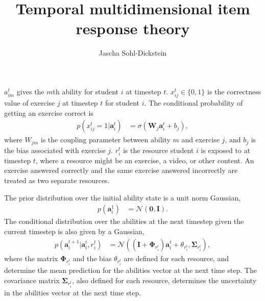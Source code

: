 \documentclass{article}
\title{
Temporal multidimensional item response theory
}
\author{
Jascha Sohl-Dickstein
}
\newcommand{\mb}{\mathbf}
\newcommand{\mc}{\mathcal}
\begin{document}
\maketitle

$a_{im}^t$ gives the $m$th ability for student $i$ at timestep $t$.  $x_{ij}^t \in \{0,1\}$ is the correctness value of exercise $j$ at timestep $t$ for student $i$.  The conditional probability of getting an exercise correct is
\begin{align}
p\left( x_{ij}^t = 1 | \mb a_i^t \right) & = \sigma\left( \mb W_j \mb a_i^t + b_j \right),
\label{eq cond x}
\end{align}
where $W_{jm}$ is the coupling parameter between ability $m$ and exercise $j$, and $b_j$ is the bias associated with exercise $j$.  
$r_i^t$ is the resource student $i$ is exposed to at timestep $t$, where a resource might be an exercise, a video, or other content.  An exercise answered correctly and the same exercise answered incorrectly are treated as two separate resources.

The prior distribution over the initial ability state is a unit norm Gaussian,
\begin{align}
p\left( \mb a_i^1 \right) & = \mc N \left( \mb 0, \mb I\right).
\end{align}
The conditional distribution over the abilities at the next timestep given the current timestep is also given by a Gaussian,
\begin{align}
p\left(  \mb a_i^{t+1} | \mb a_i^t, r_i^t \right) & = \mc N \left( \left(\mb I + \mb \Phi_{r_i^t}\right) \mb a_i^t + \theta_{r_i^t}, \mb \Sigma_{r_i^t} \right)
,
\label{eq cond a}
\end{align}
where the matrix $\mb \Phi_{r_i^t}$ and the bias $\theta_{r_i^t}$ are defined for each resource, and determine the mean prediction for the abilities vector at the next time step.  The covariance matrix $\mb \Sigma_{r_i^t}$, also defined for each resource, determines the uncertainty in the abilities vector at the next time step.
\end{document}
